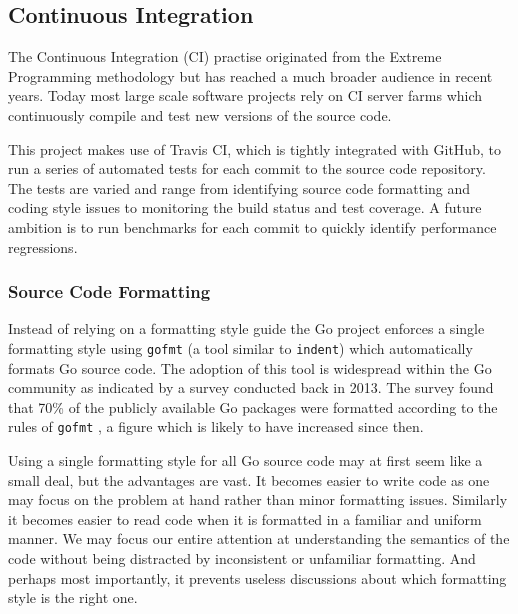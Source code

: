 

\subsection{Continuous Integration}


The Continuous Integration (CI) practise originated from the Extreme Programming methodology \cite{xp} but has reached a much broader audience in recent years. Today most large scale software projects rely on CI server farms which continuously compile and test new versions of the source code.

This project makes use of Travis CI, which is tightly integrated with GitHub, to run a series of automated tests for each commit to the source code repository. The tests are varied and range from identifying source code formatting and coding style issues to monitoring the build status and test coverage. A future ambition is to run benchmarks for each commit to quickly identify performance regressions.

\subsubsection{Source Code Formatting}

Instead of relying on a formatting style guide the Go project enforces a single formatting style using \texttt{gofmt} (a tool similar to \texttt{indent}) which automatically formats Go source code. The adoption of this tool is widespread within the Go community as indicated by a survey conducted back in 2013. The survey found that 70\% of the publicly available Go packages were formatted according to the rules of \texttt{gofmt} \cite{gofmt_70percent}, a figure which is likely to have increased since then.

Using a single formatting style for all Go source code may at first seem like a small deal, but the advantages are vast. It becomes easier to write code as one may focus on the problem at hand rather than minor formatting issues. Similarly it becomes easier to read code when it is formatted in a familiar and uniform manner. We may focus our entire attention at understanding the semantics of the code without being distracted by inconsistent or unfamiliar formatting. And perhaps most importantly, it prevents useless discussions about which formatting style is the right one.

